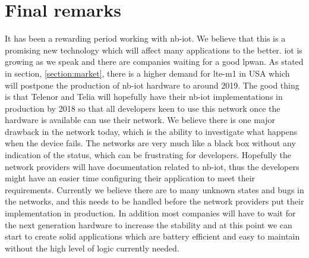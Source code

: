 \documentclass[USenglish]{ifimaster}  %
\begin{document}
\section{Final remarks}
It has been a rewarding period working with \acrshort{nb-iot}. We believe that this is a promising new technology which will affect many applications to the better. \acrshort{iot} is growing as we speak and there are companies waiting for a good \acrshort{lpwan}. As stated in section, \vref{section:market}, there is a higher demand for \acrshort{lte-m1} in USA which will postpone the production of \acrshort{nb-iot} hardware to around 2019. The good thing is that Telenor and Telia will hopefully have their \acrshort{nb-iot} implementations in production by 2018 so that all developers keen to use this network once the hardware is available can use their network. We believe there is one major drawback in the network today, which is the ability to investigate what happens when the device fails. The networks are very much like a black box without any indication of the status, which can be frustrating for developers. Hopefully the network providers will have documentation related to \acrshort{nb-iot}, thus the developers might have an easier time configuring their application to meet their requirements. Currently we believe there are to many unknown states and bugs in the networks, and this needs to be handled before the network providers put their implementation in production. In addition most companies will have to wait for the next generation hardware to increase the stability and at this point we can start to create solid applications which are battery efficient and easy to maintain without the high level of logic currently needed.

\backmatter{}
\printbibliography
\printglossary[type=\acronymtype]
\end{document}
